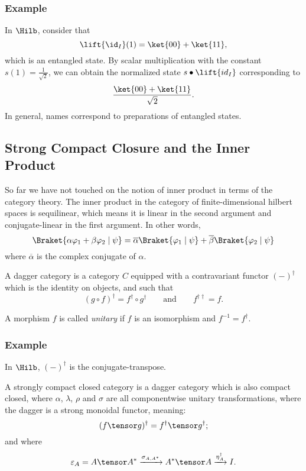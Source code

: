 \subsubsection*{Example} In $\Hilb$, consider that
\[ \lift{\id_I}(1) = \ket{00} + \ket{11}, \]
which is an entangled state. By scalar multiplication with the constant
$s(1)=\frac 1 {\sqrt{2}}$, we can obtain the normalized state 
$s \bullet \lift{id_I}$ corresponding to 
\[ \frac {\ket{00} + \ket{11}} {\sqrt{2}}. \]
In general, names correspond to preparations of entangled states.

\subsection{Strong Compact Closure and the Inner Product}

So far we have not touched on the notion of inner product in terms of the category theory.
The inner product in the category of finite-dimensional hilbert spaces is sequilinear,
which means it is linear in the second argument and conjugate-linear in the first argument.
In other words,
\[ \Braket{\alpha \varphi_1 + \beta \varphi_2 \mid \psi} 
   = \overline{\alpha} \Braket{\varphi_1 \mid \psi} + \overline{\beta} \Braket{\varphi_2 \mid \psi}
\]
where $\overline{\alpha}$ is the complex conjugate of $\alpha$.


\begin{definition}
    A dagger category is a category $C$ equipped with a contravariant functor $(-)^\dagger$ 
    which is the identity on objects, and such that 
    \[ (g \circ f)^\dagger = f^\dagger \circ g^\dagger \qquad\text{and}\qquad f^{\dagger\dagger} = f. \]
\end{definition}

A morphism $f$ is called \emph{unitary} if $f$ is an isomorphism and $f^{-1}=f^\dagger$.

\subsubsection*{Example} In $\Hilb$, $(-)^\dagger$ is the conjugate-transpose.

\begin{definition}
    A strongly compact closed category is a dagger category which is also compact closed,
    where $\alpha$, $\lambda$, $\rho$ and $\sigma$ are all componentwise unitary transformations,
    where the dagger is a strong monoidal functor, meaning:
    \[ (f \tensor g)^\dagger = f^\dagger \tensor g^\dagger; \]
    and where
    \[ \varepsilon_A = A \tensor A^*
        \xrightarrow{\sigma_{A,A^*}} A^* \tensor A
        \xrightarrow{\eta_A^\dagger} I.
    \]
\end{definition}


